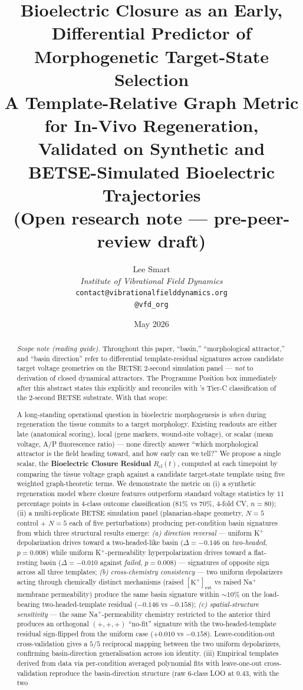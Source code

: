 \documentclass[11pt,a4paper]{article}
\title{\textbf{Bioelectric Closure as an Early, Differential Predictor of Morphogenetic Target-State Selection}\\[2pt]
\large A Template-Relative Graph Metric for In-Vivo Regeneration, Validated on Synthetic and BETSE-Simulated Bioelectric Trajectories\\[1pt]
\small (Open research note --- pre-peer-review draft)}
\author{%
  Lee Smart\\[4pt]
  \textit{Institute of Vibrational Field Dynamics}\\[2pt]
  \texttt{contact@vibrationalfielddynamics.org}\\[2pt]
  \texttt{@vfd\_org}%
}
\date{May 2026}
\begin{document}
\maketitle
\thispagestyle{empty}

\begin{abstract}
\noindent
\emph{Scope note (reading guide).} Throughout this paper, ``basin,'' ``morphological attractor,'' and ``basin direction'' refer to differential template-residual signatures across candidate target voltage geometries on the BETSE 2-second simulation panel --- \emph{not} to derivation of closed dynamical attractors. The Programme Position box immediately after this abstract states this explicitly and reconciles with \citet{SmartClosureDistance}'s Tier-C classification of the 2-second BETSE substrate. With that scope:

A long-standing operational question in bioelectric morphogenesis is \emph{when} during regeneration the tissue commits to a target morphology. Existing readouts are either late (anatomical scoring), local (gene markers, wound-site voltage), or scalar (mean voltage, A/P fluorescence ratio) --- none directly answer ``which morphological attractor is the field heading toward, and how early can we tell?'' We propose a single scalar, the \textbf{Bioelectric Closure Residual} $R_{\mathrm{cl}}(t)$, computed at each timepoint by comparing the tissue voltage graph against a candidate target-state template using five weighted graph-theoretic terms. We demonstrate the metric on (i) a synthetic regeneration model where closure features outperform standard voltage statistics by $11$ percentage points in $4$-class outcome classification ($81\%$ vs $70\%$, $4$-fold CV, $n=80$); (ii) a multi-replicate BETSE simulation panel (planarian-shape geometry, $N=5$ control $+$ $N=5$ each of five perturbations) producing per-condition basin signatures from which three structural results emerge: \emph{(a) direction reversal} --- uniform K$^{+}$ depolarization drives toward a two-headed-like basin ($\Delta=-0.146$ on \textit{two-headed}, $p=0.008$) while uniform K$^{+}$-permeability hyperpolarization drives toward a flat-resting basin ($\Delta=-0.010$ against \textit{failed}, $p=0.008$) --- signatures of opposite sign across all three templates; \emph{(b) cross-chemistry consistency} --- two uniform depolarizers acting through chemically distinct mechanisms (raised $[\mathrm{K}^{+}]_{\mathrm{ext}}$ vs raised Na$^{+}$ membrane permeability) produce the same basin signature within $\sim$$10$\% on the load-bearing two-headed-template residual ($-0.146$ vs $-0.158$); \emph{(c) spatial-structure sensitivity} --- the same Na$^{+}$-permeability chemistry restricted to the anterior third produces an orthogonal $(+,+,+)$ ``no-fit'' signature with the two-headed-template residual sign-flipped from the uniform case ($+0.010$ vs $-0.158$). Leave-condition-out cross-validation gives a $5/5$ reciprocal mapping between the two uniform depolarizers, confirming basin-direction generalisation across ion identity. (iii) Empirical templates derived from data via per-condition averaged polynomial fits with leave-one-out cross-validation reproduce the basin-direction structure (raw $6$-class LOO at $0.43$, with the two 
\end{abstract}
\end{document}
